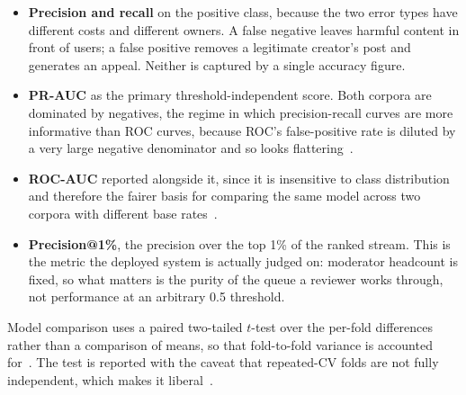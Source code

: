\begin{itemize}
    \item \textbf{Precision and recall} on the positive class, because the two error types
    have different costs and different owners. A false negative leaves harmful content in
    front of users; a false positive removes a legitimate creator's post and generates an
    appeal. Neither is captured by a single accuracy figure.

    \item \textbf{PR-AUC} as the primary threshold-independent score. Both corpora are
    dominated by negatives, the regime in which precision-recall curves are more
    informative than ROC curves, because ROC's false-positive rate is diluted by a very
    large negative denominator and so looks flattering~\cite{davis2006relationship,
    saito2015precision}.

    \item \textbf{ROC-AUC} reported alongside it, since it is insensitive to class
    distribution and therefore the fairer basis for comparing the same model across two
    corpora with different base rates~\cite{pageEvaluating}.

    \item \textbf{Precision@1\%}, the precision over the top 1\% of the ranked stream.
    This is the metric the deployed system is actually judged on: moderator headcount is
    fixed, so what matters is the purity of the queue a reviewer works through, not
    performance at an arbitrary 0.5 threshold.
\end{itemize}

Model comparison uses a paired two-tailed $t$-test over the per-fold differences rather
than a comparison of means, so that fold-to-fold variance is accounted
for~\cite{pageEvaluating}. The test is reported with the caveat that repeated-CV folds
are not fully independent, which makes it liberal~\cite{dietterich1998approximate}.

